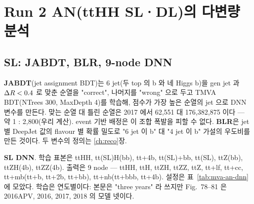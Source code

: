 \section{Run 2 AN(ttHH SL·DL)의 다변량 분석}\label{sec:mva-an}

\subsection{SL: JABDT, BLR, 9-node DNN}\label{sec:mva-an-sl}

\textbf{JABDT}(jet assignment BDT)는 6 jet(두 top 의 b 와 네 Higgs b)을 gen jet 과 $\Delta R<0.4$ 로 맞춘 순열을 "correct", 나머지를 "wrong" 으로 두고
TMVA BDT(NTrees 300, MaxDepth 4)를 학습해, 점수가 가장 높은 순열의 jet 으로 DNN 변수를 만든다.
맞는 순열 대 틀린 순열은 2017 에서 62{,}551 대 176{,}382{,}875 이다 — 약 1 : 2{,}800(우리 계산). event 기반
배정은 이 조합 폭발을 피할 수 없다. \textbf{BLR}은 jet 별 DeepJet 값의 flavour 별 확률 밀도로 "6 jet 이 b" 대 "4 jet 이 b" 가설의 우도비를 만든
것이다. 두 변수의 정의는 \ref{ch:reco}장.

\textbf{SL DNN}. 학습 표본은 ttHH, tt(SL)H(bb), tt+4b, tt(SL)+bb, tt(SL), ttZ(bb), ttZH(4b), ttZZ(4b).
출력은 9 node — ttHH, ttH, ttZH, ttZZ, ttZ, tt+lf, tt+cc, tt+mb(tt+b, tt+2b, tt+bb), tt+nb(tt+bbb, tt+4b).
설정은 표~\ref{tab:mva-an-dnn} 에 모았다. 학습은 연도별이다: 본문은 "three years" 라 쓰지만 Fig.~78--81 은 2016APV, 2016, 2017, 2018 의
모델 넷이다.

